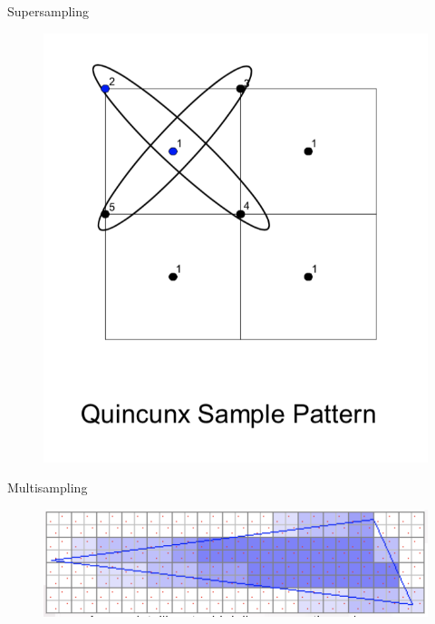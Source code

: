 \documentclass[table]{beamer}
\begin{document}
\begin{frame}[fragile]{Supersampling}
    \begin{figure}
        \includegraphics[width=.5\linewidth]{./figures/quincunx.png}
    \end{figure}
\end{frame}

\begin{frame}[fragile]{Multisampling}
    \begin{figure}
        \includegraphics[width=\linewidth]{./figures/msaasample.png}
    \end{figure}
\end{frame}
\end{document}
